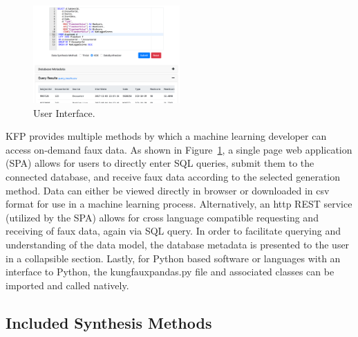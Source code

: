 \documentclass{article}
\begin{document}
\begin{figure}%
  \centering
  \includegraphics[width=0.5\textwidth]{ui_screenshot3}
  \caption{User Interface.}
  \label{fig:ui}
\end{figure}
KFP provides multiple methods by which a machine learning developer can access on-demand faux data. As shown in Figure~\ref{fig:ui}, a single page web application (SPA) allows for users to directly enter SQL queries, submit them to the connected database, and receive faux data according to the selected generation method. Data can either be viewed directly in browser or downloaded in csv format for use in a machine learning process. Alternatively, an http REST service (utilized by the SPA) allows for cross language compatible requesting and receiving of faux data, again via SQL query. In order to facilitate querying and understanding of the data model, the database metadata is presented to the user in a collapsible section. Lastly, for Python based software or languages with an interface to Python, the kungfauxpandas.py file and associated classes can be imported and called natively.

\subsection{Included Synthesis Methods}
\end{document}
